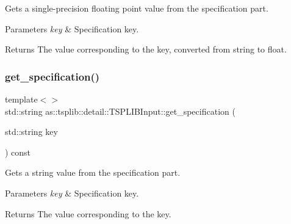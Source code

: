 Gets a single-\/precision floating point value from the specification part. 


\begin{DoxyParams}{Parameters}
{\em key} & Specification key. \\
\hline
\end{DoxyParams}
\begin{DoxyReturn}{Returns}
The value corresponding to the key, converted from string to float. 
\end{DoxyReturn}
\mbox{\label{classas_1_1tsplib_1_1detail_1_1TSPLIBInput_a0e7f98c294d79592b684722a2c8ac327}} 
\subsubsection{\texorpdfstring{get\+\_\+specification()}{get\_specification()}\hspace{0.1cm}{\footnotesize\ttfamily [4/4]}}
{\footnotesize\ttfamily template$<$$>$ \\
std\+::string as\+::tsplib\+::detail\+::\+T\+S\+P\+L\+I\+B\+Input\+::get\+\_\+specification (\begin{DoxyParamCaption}\item[{std\+::string}]{key }\end{DoxyParamCaption}) const\hspace{0.3cm}{\ttfamily [inline]}}



Gets a string value from the specification part. 


\begin{DoxyParams}{Parameters}
{\em key} & Specification key. \\
\hline
\end{DoxyParams}
\begin{DoxyReturn}{Returns}
The value corresponding to the key. 
\end{DoxyReturn}
\mbox{\label{classas_1_1tsplib_1_1detail_1_1TSPLIBInput_a5a47c5f9370f18a1e752ec6623db4269}} 
